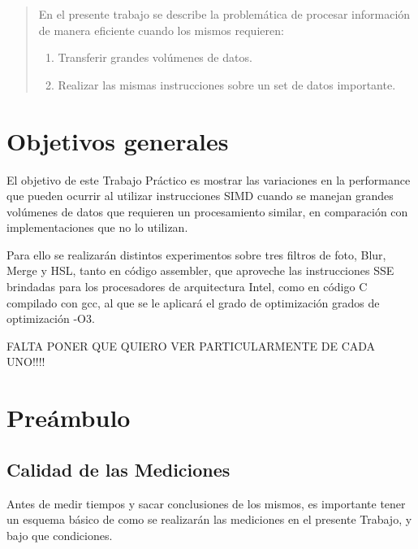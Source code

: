 \documentclass[a4paper]{article}
\begin{document}
\thispagestyle{empty}

\maketitle
\newpage

\thispagestyle{empty}
\vfill
\begin{abstract}
En el presente trabajo se describe la problemática de procesar información de manera eficiente cuando los mismos requieren:
\begin{enumerate}
\item Transferir grandes volúmenes de datos.
\item Realizar las mismas instrucciones sobre un set de datos importante.
\end{enumerate}
\end{abstract}
\thispagestyle{empty}
\vspace{3cm}
\tableofcontents
\newpage

\section{Objetivos generales}
El objetivo de este Trabajo Práctico es mostrar las variaciones en la performance que pueden ocurrir al utilizar instrucciones SIMD cuando se manejan grandes volúmenes de datos que requieren un procesamiento similar, en comparación con implementaciones que no lo utilizan.

Para ello se realizarán distintos experimentos sobre tres filtros de foto, Blur, Merge y HSL, tanto en código assembler, que aproveche las instrucciones SSE brindadas para los procesadores de arquitectura Intel, como en código C compilado con gcc, al que se le aplicará el grado de optimización grados de optimización -O3.

FALTA PONER QUE QUIERO VER PARTICULARMENTE DE CADA UNO!!!!


\newpage
\section{Preámbulo}

\subsection{Calidad de las Mediciones}
Antes de medir tiempos y sacar conclusiones de los mismos, es importante tener un esquema básico de como se realizarán las mediciones en el presente Trabajo, y bajo que condiciones.
\end{document}
